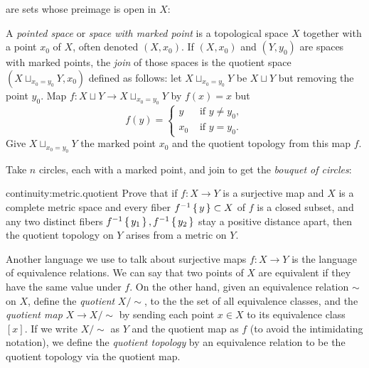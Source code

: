 are sets whose preimage is open in \(X\):
\begin{center}

\end{center}
\begin{example}
A \emph{pointed space} or \emph{space with marked point} is a topological space \(X\) together with a point \(x_0\) of \(X\), often denoted \((X,x_0)\).
If \((X,x_0)\) and \((Y,y_0)\) are spaces with marked points, the \emph{join} of those spaces is the quotient space \((X \sqcup_{x_0=y_0} Y,x_0)\) defined as follows:
let \(X \sqcup_{x_0=y_0} Y\) be \(X \sqcup Y\) but removing the point \(y_0\).
Map \(f \colon X \sqcup Y \to X \sqcup_{x_0=y_0} Y\) by \(f(x)=x\) but
\[
f(y)=
\begin{cases}
y & \text{ if \(y\ne y_0\)}, \\
x_0 & \text{ if \(y=y_0\)}.
\end{cases}
\]
Give \(X \sqcup_{x_0=y_0} Y\) the marked point \(x_0\) and the quotient topology from this map \(f\).
\end{example}
\begin{exampleAndImage}{1.29cm}
Take \(n\) circles, each with a marked point, and join to get the \emph{bouquet of circles}:
\tcblower

\end{exampleAndImage}
\begin{problem}{continuity:metric.quotient}
Prove that if \(f \colon X \to Y\) is a surjective map and \(X\) is a complete metric space and every fiber \(f^{-1}\set{y} \subset X\) of \(f\) is a closed subset, and any two distinct fibers \(f^{-1}\set{y_1}, f^{-1}\set{y_2}\) stay a positive distance apart, then the quotient topology on \(Y\) arises from a metric on \(Y\).
\end{problem}
Another language we use to talk about surjective maps \(f \colon X \to Y\) is the language of equivalence relations.
We can say that two points of \(X\) are equivalent if they have the same value under \(f\).
On the other hand, given an equivalence relation \(\sim\) on \(X\), define the \emph{quotient} \(X/{\sim}\), to the the set of all equivalence classes, and the \emph{quotient map}%
 \(X \to X/{\sim}\) by sending each point \(x \in X\) to its equivalence class \([x]\).
If we write \(X/{\sim}\) as \(Y\) and the quotient map as \(f\) (to avoid the intimidating notation), we define the \emph{quotient topology} by an equivalence relation to be the quotient topology via the quotient map.

